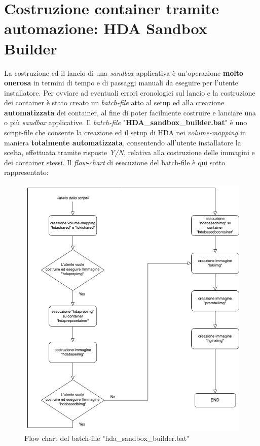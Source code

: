 \newpage
\section{Costruzione container tramite automazione: HDA Sandbox Builder}
La costruzione ed il lancio di una \textit{sandbox} applicativa è un'operazione \textbf{molto onerosa} in termini di tempo e di passaggi manuali da eseguire per l'utente installatore.
Per ovviare ad eventuali errori cronologici sul lancio e la costruzione dei container è stato creato un \textit{batch-file} atto al setup ed alla creazione \textbf{automatizzata} dei container, al fine di poter facilmente costruire e lanciare una o più \textit{sandbox} applicative.
Il \textit{batch-file} "\textbf{HDA\_sandbox\_builder.bat}" è uno script-file che consente la creazione ed il setup di HDA nei \textit{volume-mapping} in maniera \textbf{totalmente automatizzata}, consentendo all'utente installatore la scelta, effettuata tramite risposte \textit{Y/N}, relativa alla costruzione delle immagini e dei container stessi.
Il \textit{flow-chart} di esecuzione del batch-file è qui sotto rappresentato:
\\
\begin{figure}[!h]     
\centering 
    \includegraphics[width=0.8 \columnwidth]{immagini/img/hda_sandbox_builder_fc} 
    \caption{Flow chart del batch-file "hda\_sandbox\_builder.bat"}
\end{figure}\\
